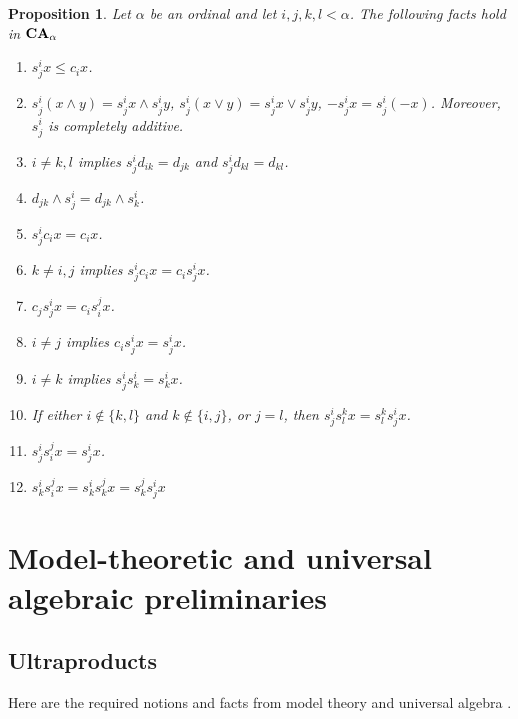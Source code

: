 \documentclass[a4paper]{article}
\theoremstyle{defin}
\theoremstyle{theorem}
\theoremstyle{prop}
\newtheorem{prop}{Proposition}
\theoremstyle{lemma}
\theoremstyle{fact}
\theoremstyle{ex}
\theoremstyle{col}
\begin{document}
\begin{prop} Let $\alpha$ be an ordinal and let $i, j, k, l < \alpha$. The following facts hold in ${\bf CA}_{\alpha}$

  \begin{enumerate}
    \item $s^{i}_j x \leq c_i x$.
    \item $s^{i}_j (x \land y) = s^{i}_j x \land s^{i}_j y$, $s^{i}_j (x \lor y) = s^{i}_j x \lor s^{i}_j y$, $- s^{i}_j x = s^{i}_j (- x)$.
    Moreover, $s^{i}_j$ is completely additive.
    \item $i \neq k, l$ implies $s^i_j d_{ik} = d_{jk}$ and $s^i_j d_{kl} = d_{kl}$.
    \item $d_{jk} \land s^{i}_j = d_{jk} \land s^{i}_k$.
    \item $s^i_j c_i x = c_i x$.
    \item $k \neq i,j$ implies $s^i_j c_i x = c_i s^i_j x$.
    \item $c_j s^i_j x = c_i s^j_i x$.
    \item $i \neq j$ implies $c_i s^i_j x = s^i_j x$.
    \item $i \neq k$ implies $s^i_j s^i_k = s^i_k x$.
    \item If either $i \notin \{ k, l\}$ and $k \notin \{ i, j\}$, or $j = l$, then $s^i_j s^k_l x = s^k_l s^i_j x$.
    \item $s^i_j s^j_i x = s^i_j x$.
    \item $s^i_k s^j_i x = s^i_k s^j_k x = s^j_k s^i_j x$
  \end{enumerate}
\end{prop}


\section{Model-theoretic and universal algebraic preliminaries}

\subsection{Ultraproducts}

Here are the required notions and facts from model theory and universal algebra \cite{hirsch2002relation} \cite{hodges1997shorter} \cite{sankappanavar1981course}.
\end{document}
